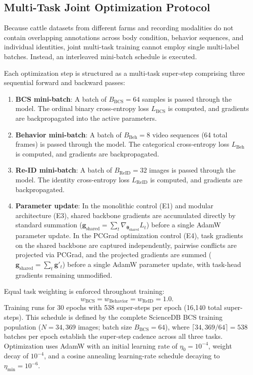 

\subsection{Multi-Task Joint Optimization Protocol}

Because cattle datasets from different farms and recording modalities do not contain overlapping annotations across body condition, behavior sequences, and individual identities, joint multi-task training cannot employ single multi-label batches. Instead, an interleaved mini-batch schedule is executed.

Each optimization step is structured as a multi-task super-step comprising three sequential forward and backward passes:
\begin{enumerate}
 \item \textbf{BCS mini-batch}: A batch of $B_{\mathrm{BCS}} = 64$ samples is passed through the model. The ordinal binary cross-entropy loss $L_{\mathrm{BCS}}$ is computed, and gradients are backpropagated into the active parameters.
 \item \textbf{Behavior mini-batch}: A batch of $B_{\mathrm{Beh}} = 8$ video sequences (64 total frames) is passed through the model. The categorical cross-entropy loss $L_{\mathrm{Beh}}$ is computed, and gradients are backpropagated.
 \item \textbf{Re-ID mini-batch}: A batch of $B_{\mathrm{ReID}} = 32$ images is passed through the model. The identity cross-entropy loss $L_{\mathrm{ReID}}$ is computed, and gradients are backpropagated.
 \item \textbf{Parameter update}: In the monolithic control (E1) and modular architecture (E3), shared backbone gradients are accumulated directly by standard summation ($\mathbf{g}_{\mathrm{shared}} = \sum_t \nabla_{\boldsymbol{\theta}_{\mathrm{shared}}} L_t$) before a single AdamW parameter update. In the PCGrad optimization control (E4), task gradients on the shared backbone are captured independently, pairwise conflicts are projected via PCGrad, and the projected gradients are summed ($\mathbf{g}_{\mathrm{shared}} = \sum_t \mathbf{g}'_t$) before a single AdamW parameter update, with task-head gradients remaining unmodified.
\end{enumerate}

Equal task weighting is enforced throughout training:
\begin{equation}
 w_{\mathrm{BCS}} = w_{\mathrm{Behavior}} = w_{\mathrm{ReID}} = 1.0.
\end{equation}
Training runs for 30 epochs with 538 super-steps per epoch (16,140 total super-steps). This schedule is defined by the complete ScienceDB BCS training population ($N = 34{,}369$ images; batch size $B_{\mathrm{BCS}} = 64$), where $\lceil 34{,}369 / 64 \rceil = 538$ batches per epoch establish the super-step cadence across all three tasks. Optimization uses AdamW with an initial learning rate of $\eta_0 = 10^{-4}$, weight decay of $10^{-4}$, and a cosine annealing learning-rate schedule decaying to $\eta_{\min} = 10^{-6}$.

